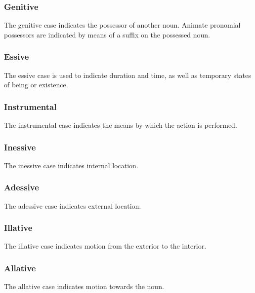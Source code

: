 \documentclass[grammar]{subfiles}
\begin{document}
\subsubsection{Genitive}
\label{nm_genitive_case}

The genitive case indicates the possessor of another noun.  Animate pronomial
possessors are indicated by means of a suffix on the possessed noun.

\subsubsection{Essive}
\label{nm_essive_case}

The essive case is used to indicate duration and time, as well as temporary
states of being or existence.  

\subsubsection{Instrumental}
\label{nm_instrumental_case}

The instrumental case indicates the means by which the action is
performed.    

\subsubsection{Inessive}
\label{nm_inessive_case}

The inessive case indicates internal location.  

\subsubsection{Adessive}
\label{nm_adessive_case}

The adessive case indicates external location.

\subsubsection{Illative}
\label{nm_illative_case}

The illative case indicates motion from the exterior to the interior.

\subsubsection{Allative}
\label{nm_allative_case}

The allative case indicates motion towards the noun. 
\end{document}
